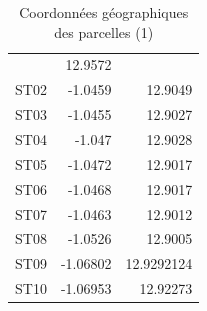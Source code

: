 \documentclass[a4paper,11pt]{article}
\begin{document}
\begin{table}
\begin{center}
\begin{tabular}{|l|r|r|}
       & 12.9572 \\ ST02 & -1.0459 & 12.9049 \\ ST03 & -1.0455 &
       12.9027 \\ ST04 & -1.047 & 12.9028 \\ ST05 & -1.0472 & 12.9017
       \\ ST06 & -1.0468 & 12.9017 \\ ST07 & -1.0463 & 12.9012 \\ ST08
       & -1.0526 & 12.9005 \\ ST09 & -1.06802 & 12.9292124 \\ ST10 &
       -1.06953 & 12.92273 \\ \hline
     \end{tabular}
      \caption{Coordonnées géographiques des parcelles (1)}
      \label{tableau:Coordonnées géographiques des parcelles}
    \end{center}
\end{table}
\end{document}
